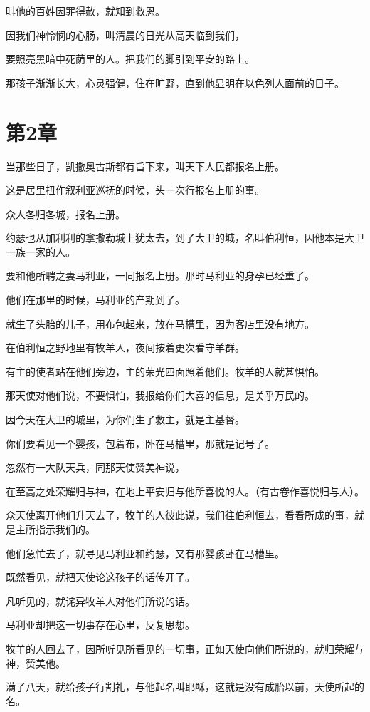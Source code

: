 \documentclass[12pt,oneside]{book}
\begin{document}
叫他的百姓因罪得赦，就知到救恩。

因我们神怜悯的心肠，叫清晨的日光从高天临到我们，

要照亮黑暗中死荫里的人。把我们的脚引到平安的路上。

那孩子渐渐长大，心灵强健，住在旷野，直到他显明在以色列人面前的日子。

\chapter{第2章}
当那些日子，凯撒奥古斯都有旨下来，叫天下人民都报名上册。

这是居里扭作叙利亚巡抚的时候，头一次行报名上册的事。

众人各归各城，报名上册。

约瑟也从加利利的拿撒勒城上犹太去，到了大卫的城，名叫伯利恒，因他本是大卫一族一家的人。

要和他所聘之妻马利亚，一同报名上册。那时马利亚的身孕已经重了。

他们在那里的时候，马利亚的产期到了。

就生了头胎的儿子，用布包起来，放在马槽里，因为客店里没有地方。

在伯利恒之野地里有牧羊人，夜间按着更次看守羊群。

有主的使者站在他们旁边，主的荣光四面照着他们。牧羊的人就甚惧怕。

那天使对他们说，不要惧怕，我报给你们大喜的信息，是关乎万民的。

因今天在大卫的城里，为你们生了救主，就是主基督。

你们要看见一个婴孩，包着布，卧在马槽里，那就是记号了。

忽然有一大队天兵，同那天使赞美神说，

在至高之处荣耀归与神，在地上平安归与他所喜悦的人。（有古卷作喜悦归与人）。

众天使离开他们升天去了，牧羊的人彼此说，我们往伯利恒去，看看所成的事，就是主所指示我们的。

他们急忙去了，就寻见马利亚和约瑟，又有那婴孩卧在马槽里。

既然看见，就把天使论这孩子的话传开了。

凡听见的，就诧异牧羊人对他们所说的话。

马利亚却把这一切事存在心里，反复思想。

牧羊的人回去了，因所听见所看见的一切事，正如天使向他们所说的，就归荣耀与神，赞美他。

满了八天，就给孩子行割礼，与他起名叫耶酥，这就是没有成胎以前，天使所起的名。
\end{document}
